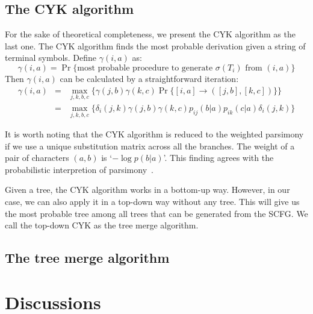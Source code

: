 \documentclass[pdftex,11pt]{article}
\begin{document}
\subsection{The CYK algorithm}
For the sake of theoretical completeness, we present the CYK algorithm
as the last one.  The CYK algorithm finds the most probable derivation
given a string of terminal symbols.  Define $\gamma(i,a)$ as:
\begin{equation}
  \gamma(i,a)=\Pr\{\mbox{most probable procedure to generate $\sigma(T_i)$ from $(i,a)$}\}
\end{equation}
Then $\gamma(i,a)$ can be calculated by a straightforward iteration:
\begin{eqnarray}
  \gamma(i,a)&=&\max_{j,k,b,c}\Big\{\gamma(j,b)\gamma(k,c)\Pr\{[i,a]\rightarrow([j,b],[k,c])\}\Big\}\nonumber\\
  &=&\max_{j,k,b,c}\Big\{\delta_i(j,k)\gamma(j,b)\gamma(k,c)p_{ij}(b|a)p_{ik}(c|a)\delta_i(j,k)\Big\}
\end{eqnarray}

It is worth noting that the CYK algorithm is reduced to the weighted
parsimony if we use a unique substitution matrix across all the
branches. The weight of a pair of characters $(a,b)$ is `$-\log
p(b|a)$'. This finding agrees with the probabilistic interpretion of
parsimony~\citep{felsenstein81b}.

Given a tree, the CYK algorithm works in a bottom-up way. However, in
our case, we can also apply it in a top-down way without any tree. This
will give us the most probable tree among all trees that can be
generated from the SCFG. We call the top-down CYK as the tree merge
algorithm.

\subsection{The tree merge algorithm}

\section{Discussions}
\end{document}
